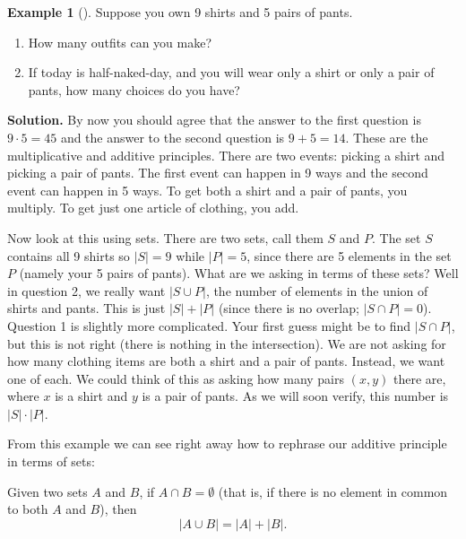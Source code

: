 \documentclass[10pt,]{book}
\theoremstyle{plain}
\theoremstyle{definition}
\theoremstyle{definition}
\newtheorem{example}[theorem]{Example}
\theoremstyle{definition}
\theoremstyle{definition}
\numberwithin{equation}{chapter}
\newcommand{\card}[1]{\left| #1 \right|}
\begin{document}
\begin{example}[]\label{example-39}
\hypertarget{p-701}{}%
Suppose you own 9 shirts and 5 pairs of pants.%
\par
\hypertarget{p-702}{}%
\leavevmode%
\begin{enumerate}
\item\hypertarget{li-333}{}\hypertarget{p-703}{}%
How many outfits can you make?%
\item\hypertarget{li-334}{}\hypertarget{p-704}{}%
If today is half-naked-day, and you will wear only a shirt or only a pair of pants, how many choices do you have?%
\end{enumerate}
%
\par\smallskip%
\noindent\textbf{Solution.}\hypertarget{solution-80}{}\quad%
\hypertarget{p-705}{}%
By now you should agree that the answer to the first question is \(9 \cdot 5 = 45\) and the answer to the second question is \(9 + 5 = 14\). These are the multiplicative and additive principles. There are two events: picking a shirt and picking a pair of pants. The first event can happen in 9 ways and the second event can happen in 5 ways. To get both a shirt and a pair of pants, you multiply. To get just one article of clothing, you add.%
\par
\hypertarget{p-706}{}%
Now look at this using sets. There are two sets, call them \(S\) and \(P\). The set \(S\) contains all 9 shirts so \(|S| = 9\) while \(|P| = 5\), since there are 5 elements in the set \(P\) (namely your 5 pairs of pants). What are we asking in terms of these sets? Well in question 2, we really want \(|S \cup P|\), the number of elements in the union of shirts and pants. This is just \(|S| + |P|\) (since there is no overlap; \(|S \cap P| = 0\)). Question 1 is slightly more complicated. Your first guess might be to find \(|S \cap P|\), but this is not right (there is nothing in the intersection). We are not asking for how many clothing items are both a shirt and a pair of pants. Instead, we want one of each. We could think of this as asking how many pairs \((x,y)\) there are, where \(x\) is a shirt and \(y\) is a pair of pants. As we will soon verify, this number is \(|S| \cdot |P|\).%
\end{example}
\hypertarget{p-707}{}%
From this example we can see right away how to rephrase our additive principle in terms of sets:%
\begin{assemblage}\label{assemblage-13}
\hypertarget{p-708}{}%
 Given two sets \(A\) and \(B\), if \(A \cap B = \emptyset\) (that is, if there is no element in common to both \(A\) and \(B\)), then%
\begin{equation*}
\card{A \cup B} = \card{A} + \card{B}.
\end{equation*}
%
\end{assemblage}
\end{document}
